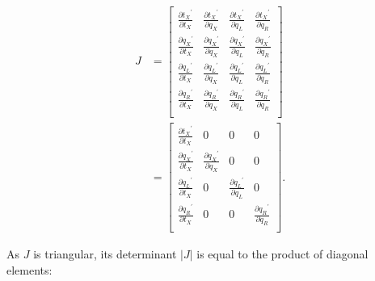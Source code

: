 \documentclass[12pt]{article}
\begin{document}
\begin{align}
	J &= \begin{bmatrix} \frac{\partial {t_X}^\prime}{\partial t_X} & \frac{\partial {t_X}^\prime}{\partial q_X} & \frac{\partial {t_X}^\prime}{\partial q_L} & \frac{\partial {t_X}^\prime}{\partial q_R} \\
			\frac{\partial {q_X}^\prime}{\partial t_X} & \frac{\partial {q_X}^\prime}{\partial q_X} & \frac{\partial {q_X}^\prime}{\partial q_L} & \frac{\partial {q_X}^\prime}{\partial q_R} \\
			\frac{\partial {q_L}^\prime}{\partial t_X} & \frac{\partial {q_L}^\prime}{\partial q_X} & \frac{\partial {q_L}^\prime}{\partial q_L} & \frac{\partial {q_L}^\prime}{\partial q_R} \\
			\frac{\partial {q_R}^\prime}{\partial t_X} & \frac{\partial {q_R}^\prime}{\partial q_X} & \frac{\partial {q_R}^\prime}{\partial q_L} & \frac{\partial {q_R}^\prime}{\partial q_R} \\ \end{bmatrix} \nonumber \\
			&= \begin{bmatrix} \frac{\partial {t_X}^\prime}{\partial t_X} & 0 & 0 & 0 \\
			\frac{\partial {q_X}^\prime}{\partial t_X} & \frac{\partial {q_X}^\prime}{\partial q_X} & 0 & 0 \\
			\frac{\partial {q_L}^\prime}{\partial t_X} & 0 & \frac{\partial {q_L}^\prime}{\partial q_L} & 0 \\
			\frac{\partial {q_R}^\prime}{\partial t_X} & 0 & 0 & \frac{\partial {q_R}^\prime}{\partial q_R} \\ \end{bmatrix}.
\end{align}


As $J$ is triangular, its determinant $|J|$ is equal to the product of diagonal elements:
\end{document}
